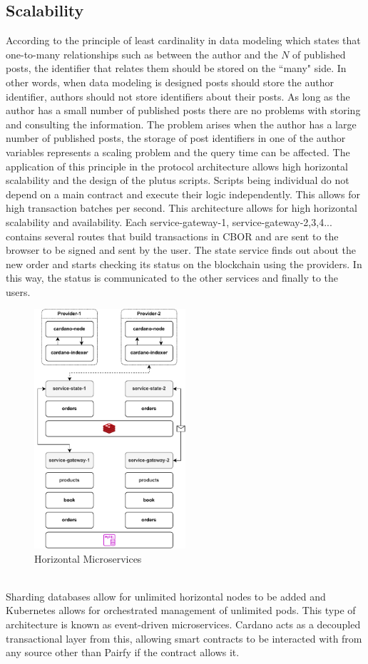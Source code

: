 \documentclass[12pt]{article}
\begin{document}
\subsection { Scalability } 

According to the principle of least cardinality in data modeling which states that one-to-many relationships such as between the author and the $N$ of published posts, the identifier that relates them should be stored on the ``many" side. In other words, when data modeling is designed posts should store the author identifier, authors should not store identifiers about their posts. As long as the author has a small number of published posts there are no problems with storing and consulting the information. The problem arises when the author has a large number of published posts, the storage of post identifiers in one of the author variables represents a scaling problem and the query time can be affected.
The application of this principle in the protocol architecture allows high horizontal scalability and the design of the plutus scripts. Scripts being individual do not depend on a main contract and execute their logic independently. This allows for high transaction batches per second. This architecture allows for high horizontal scalability and availability. Each service-gateway-1, service-gateway-2,3,4... contains several routes that build transactions in CBOR and are sent to the browser to be signed and sent by the user. The state service finds out about the new order and starts checking its status on the blockchain using the providers. In this way, the status is communicated to the other services and finally to the users.
\begin{figure}[ht]
  \centering
  \includegraphics[width=0.5\textwidth]{horizontal.drawio.pdf}
  \caption{Horizontal Microservices}
  \label{fig:microservices}
\end{figure}
\\
Sharding databases allow for unlimited horizontal nodes to be added and Kubernetes allows for orchestrated management of unlimited pods. This type of architecture is known as event-driven microservices. Cardano acts as a decoupled transactional layer from this, allowing smart contracts to be interacted with from any source other than Pairfy if the contract allows it.
\end{document}
